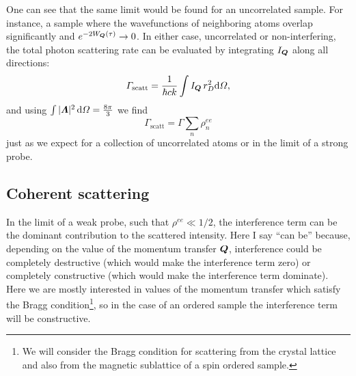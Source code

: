 One can see that the same limit would be found for an uncorrelated sample.  For
instance, a sample where the wavefunctions of neighboring atoms overlap
significantly and $e^{-2W_{\bm{Q}}(\tau)} \rightarrow 0$.  In either case, uncorrelated or
non-interfering,  the total photon scattering rate can be evaluated by
integrating $I_{\bm{Q}}$ along all directions:
\begin{equation}
  \Gamma_{\mathrm{scatt}} = \frac{1}{\hbar ck} \int I_{\bm{Q}} \,
r_{D}^{2}\mathrm{d}\Omega ,
\end{equation} 
and using $\int |\bm{\Lambda}|^{2} \,\mathrm{d}\Omega = \frac{8\pi}{3}$ we find 
\begin{equation}
 \Gamma_{\mathrm{scatt}} =\Gamma \sum_{n}  \rho_{n}^{ee}
\end{equation}
just as we expect for a collection of uncorrelated atoms or in the limit of a
strong probe. 

\subsection{Coherent scattering}

In the limit of a weak probe, such that $\rho^{ee} \ll 1/2$, the interference
term can be the dominant contribution to the scattered intensity.  Here I say
``can be'' because, depending on the value of the momentum transfer $\bm{Q}$,
interference could be completely destructive (which would make the interference
term zero) or completely constructive (which would make the interference term
dominate).  Here we are mostly interested in values of the momentum transfer
which satisfy the Bragg condition\footnote{We will consider the Bragg condition
for scattering from the crystal lattice and also from the magnetic sublattice
of a spin ordered sample.},  so in the case of an ordered sample the
interference term will be constructive. 

